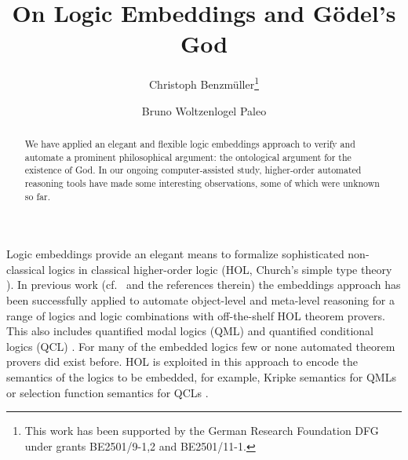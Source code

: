 \documentclass{llncs}
\begin{document}
\title{On Logic Embeddings and G\"odel's God}
\author{Christoph Benzm\"uller\thanks{This work has been supported by
    the German Research Foundation DFG under grants BE2501/9-1,2 and
    BE2501/11-1.} \and Bruno Woltzenlogel Paleo 
}


\maketitle            



\begin{abstract}
  We have applied an elegant and flexible  logic embeddings
  approach to verify and automate a prominent philosophical argument:
  the ontological argument for the existence of God. In our ongoing
  computer-assisted study, higher-order automated reasoning tools have
  made some interesting observations, some of which were unknown so
  far.
\end{abstract}



%
%

Logic embeddings provide an elegant means to formalize sophisticated
non-classical logics in classical higher-order logic (HOL, Church's
simple type theory \cite{Church40}). In previous work (cf.~\cite{C35}
and the references therein) the embeddings approach has been
successfully applied to automate object-level and meta-level reasoning
for a range of logics and logic combinations with off-the-shelf HOL
theorem provers. This also includes quantified modal logics (QML)
\cite{J23} and quantified conditional logics (QCL) \cite{C37}.  For
many of the embedded logics few or none automated theorem provers did
exist before. HOL is exploited in this approach to encode the
semantics of the logics to be embedded, for example, Kripke semantics
for QMLs \cite{fitting98} or selection function semantics for QCLs
\cite{Stalnaker68}.  
\end{document}
